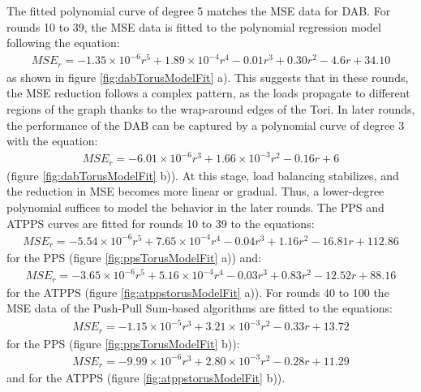 The fitted polynomial curve of degree 5 matches the MSE data for DAB. For rounds 10 to 39, the MSE data is fitted to the polynomial regression model following the equation: 
\begin{align}
    MSE_r=-1.35\times 10^{-6}r^{5}+ 1.89\times 10^{-4}r^{4}-0.01r^{3}+0.30r^{2}-4.6r+34.10    
\end{align}
as shown in figure \ref{fig:dabTorusModelFit} a). This suggests that in these rounds, the MSE reduction follows a complex pattern, as the loads propagate to different regions of the graph thanks to the wrap-around edges of the Tori. In later rounds, the performance of the DAB can be captured by a polynomial curve of degree 3 with the equation:
\begin{align}
    MSE_r=-6.01\times 10^{-6}r^{3}+1.66\times 10^{-3}r^{2}-0.16r+6    
\end{align}
(figure \ref{fig:dabTorusModelFit} b)). At this stage, load balancing stabilizes, and the reduction in MSE becomes more linear or gradual. Thus, a lower-degree polynomial suffices to model the behavior in the later rounds. The PPS and ATPPS curves are fitted for rounds 10 to 39 to the equations:
\begin{align}
    MSE_r=-5.54\times 10^{-6}r^{5}+7.65\times 10^{-4}r^{4}-0.04r^{3}+1.16r^{2}-16.81r+112.86    
\end{align}
for the PPS (figure \ref{fig:ppsTorusModelFit} a)) and:
\begin{align}
    MSE_r = -3.65 \times 10^{-6}r^{5} + 5.16 \times 10^{-4}r^{4} - 0.03r^{3} + 0.83r^{2} - 12.52r + 88.16    
\end{align}
for the ATPPS (figure \ref{fig:atppstorusModelFit} a)). For rounds 40 to 100 the MSE data of the Push-Pull Sum-based algorithms are fitted to the equations: 
\begin{align}
    MSE_r = -1.15 \times 10^{-5}r^{3} + 3.21\times 10^{-3}r^{2} - 0.33r + 13.72    
\end{align}
for the PPS (figure \ref{fig:ppsTorusModelFit} b)):
\begin{align}
    MSE_r = -9.99 \times 10^{-6}r^{3} + 2.80\times 10^{-3}r^{2} - 0.28r + 11.29    
\end{align}
and for the ATPPS (figure \ref{fig:atppstorusModelFit} b)).

